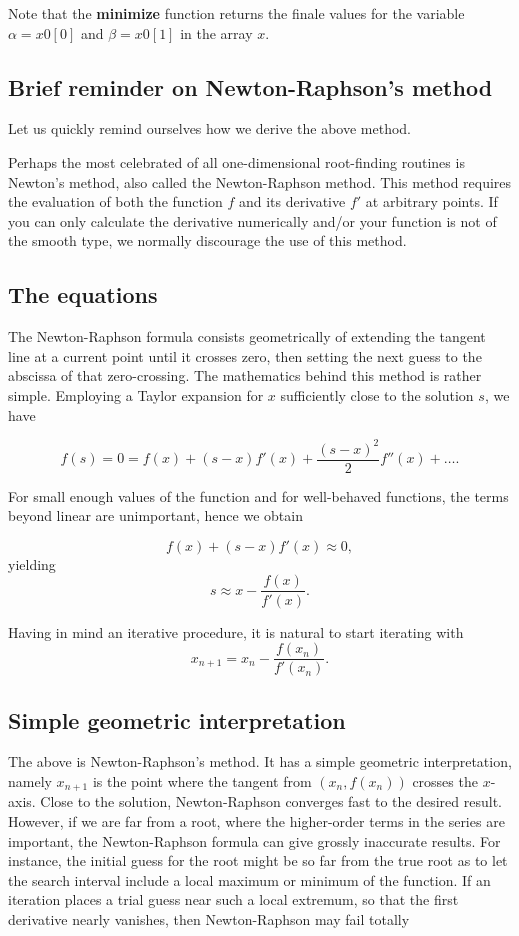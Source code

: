 \documentclass[%
oneside,                 %
final,                   %
10pt]{article}
\begin{document}
Note that the \textbf{minimize} function returns the finale values for the variable $\alpha=x0[0]$ and $\beta=x0[1]$ in the array $x$. 

\subsection*{Brief reminder on Newton-Raphson's method}

Let us quickly remind ourselves how we derive the above method.

Perhaps the most celebrated of all one-dimensional root-finding
routines is Newton's method, also called the Newton-Raphson
method. This method  requires the evaluation of both the
function $f$ and its derivative $f'$ at arbitrary points. 
If you can only calculate the derivative
numerically and/or your function is not of the smooth type, we
normally discourage the use of this method.

\subsection*{The equations}

The Newton-Raphson formula consists geometrically of extending the
tangent line at a current point until it crosses zero, then setting
the next guess to the abscissa of that zero-crossing.  The mathematics
behind this method is rather simple. Employing a Taylor expansion for
$x$ sufficiently close to the solution $s$, we have

\[
    f(s)=0=f(x)+(s-x)f'(x)+\frac{(s-x)^2}{2}f''(x) +\dots.
    \label{eq:taylornr}
\]

For small enough values of the function and for well-behaved
functions, the terms beyond linear are unimportant, hence we obtain

\[
   f(x)+(s-x)f'(x)\approx 0,
\]
yielding
\[
   s\approx x-\frac{f(x)}{f'(x)}.
\]

Having in mind an iterative procedure, it is natural to start iterating with
\[
   x_{n+1}=x_n-\frac{f(x_n)}{f'(x_n)}.
\]

\subsection*{Simple geometric interpretation}

The above is Newton-Raphson's method. It has a simple geometric
interpretation, namely $x_{n+1}$ is the point where the tangent from
$(x_n,f(x_n))$ crosses the $x$-axis.  Close to the solution,
Newton-Raphson converges fast to the desired result. However, if we
are far from a root, where the higher-order terms in the series are
important, the Newton-Raphson formula can give grossly inaccurate
results. For instance, the initial guess for the root might be so far
from the true root as to let the search interval include a local
maximum or minimum of the function.  If an iteration places a trial
guess near such a local extremum, so that the first derivative nearly
vanishes, then Newton-Raphson may fail totally
\end{document}
